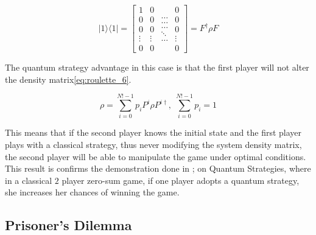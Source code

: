 \begin{equation}
\label{eq:roulette_5}
\vert1\rangle\langle1\vert=\left[\begin{array}{c}
1\\
0\\
0\\
\vdots\\
0
\end{array}\begin{array}{c}
0\\
0\\
0\\
\vdots\\
0
\end{array}\begin{array}{c}
\ldots\\
\ldots\\
\ldots\\
\ddots\\
\ldots
\end{array}\begin{array}{c}
0\\
0\\
0\\
\vdots\\
0
\end{array}\right]=F^{\dagger}\rho F
\end{equation}


The quantum strategy advantage in this case is that the first player
will not alter the density matrix\ref{eq:roulette_6}.

\begin{equation}
\label{eq:roulette_6}
\rho=\sum_{i=0}^{N!-1}p_{i}P^{i}\rho P^{i\dagger},\;\sum_{i=0}^{N!-1}p_{i}=1
\end{equation}

This means that if the second player knows the initial state and the first player plays with a classical strategy, thus never modifying the system density matrix, the second player will be able to manipulate the game under optimal conditions. This result is confirms the demonstration done in \cite{Meyer1999}; on Quantum Strategies, where in a classical $2$ player zero-sum game, if one player adopts a quantum strategy, she increases her chances of winning the game.

\clearpage
\subsection{Prisoner's Dilemma}
\label{sebsec:related_work_prisioners_dillama}

